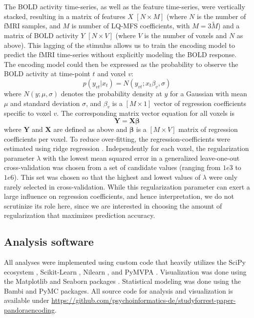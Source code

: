 The BOLD activity time-series, as well as the feature time-series, were vertically stacked, resulting in a matrix of features $X$ $[N\times M]$ (where $N$ is the number of f{MRI} samples, and $M$ is number of LQ-MFS coefficients, with $M=3\widetilde{M}$) and a matrix of BOLD activity $Y$ $[N\times V]$ (where $V$ is the number of voxels and $N$ as above). This lagging of the stimulus allows us to train the encoding model to predict the f{MRI} time-series without explicitly modeling the BOLD response. The encoding model could then be expressed as the probability to observe the BOLD activity at time-point $t$ and voxel $v$:
\begin{equation}
  \label{eq:encmo}
  p(y_{vt}|x_{t}) = N(y_{vt};x_{t}\beta_{v},\sigma)
\end{equation}
where $N(y;\mu,\sigma)$ denotes the probability density at $y$ for a
Gaussian with mean $\mu$ and standard deviation $\sigma$, and $\beta_{v}$ is a
$[M\times1]$ vector of regression coefficients specific to voxel $v$. The corresponding matrix vector equation for all voxels is
\begin{equation}
    \label{eq:encmat}
    \mathbf{Y} = \mathbf{X}\mathbf{\beta}
\end{equation}
where $\mathbf{Y}$ and $\mathbf{X}$ are defined as above and $\mathbf{\beta}$ is a $[M \times V]$ matrix of regression coefficients per voxel.
To reduce over-fitting, the regression-coefficients were estimated using ridge regression \citep{HK70}. Independently for each voxel, the regularization parameter $\lambda$ with the lowest mean squared error in a generalized leave-one-out cross-validation \citep{GHW79} was chosen from a set of candidate values (ranging from $1e3$ to $1e6$). This set was chosen so that the highest and lowest values of $\lambda$ were only rarely selected in cross-validation. While this regularization parameter can exert a large influence on regression coefficients, and hence interpretation, we do not scrutinize its role here, since we are interested in choosing the amount of regularization that maximizes prediction accuracy.

\subsection*{Analysis software}
All analyses were implemented using custom code that heavily utilizes the SciPy ecosystem \citep{jones2014scipy}, Scikit-Learn \citep{PVG+11}, Nilearn \citep{abraham2014machine}, and PyMVPA \citep{HHS09b}.
Visualization was done using the Matplotlib \citep{hunter2007matplotlib} and Seaborn packages \citep{waskom2020seaborn}.
Statistical modeling was done using the Bambi \citep{yarkoni2016bambi} and PyMC \citep{patil2010pymc} packages.
All source code for analysis and visualization is available under \url{https://github.com/psychoinformatics-de/studyforrest-paper-pandoraencoding}.

